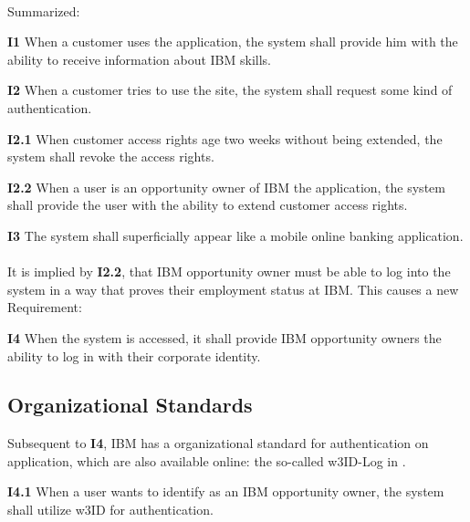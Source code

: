 \paragraph{} Summarized:

\begin{closeItem}
    \item [\textbf{I1}] When a customer uses the application, the system shall provide him with the ability to receive information about IBM skills.
    \item [\textbf{I2}] When a customer tries to use the site, the system shall request some kind of authentication.
    \item [\textbf{I2.1}] When customer access rights age two weeks without being extended, the system shall revoke the access rights.
    \item [\textbf{I2.2}\label{R2.2}] When a user is an opportunity owner of IBM the application, the system shall provide the user with the ability to extend customer access rights.
    \item [\textbf{I3}] The system shall superficially appear like a mobile online banking application.
\end{closeItem}

\paragraph{} It is implied by \textbf{I2.2}, that IBM opportunity owner must be able to log into the system in a way that proves their employment status at IBM. This causes a new Requirement:

\begin{closeItem}
    \item [\textbf{I4}] When the system is accessed, it shall provide IBM opportunity owners the ability to log in with their corporate identity.
\end{closeItem}

\subsection{Organizational Standards}
Subsequent to \textbf{I4}, IBM has a organizational standard for authentication on application, which are also available online: the so-called w3ID-Log in \parencite[cf.][]{IBMCorporation.2016}.

\begin{closeItem}
    \item [\textbf{I4.1}] When a user wants to identify as an IBM opportunity owner, the system shall utilize w3ID for authentication.
\end{closeItem}


